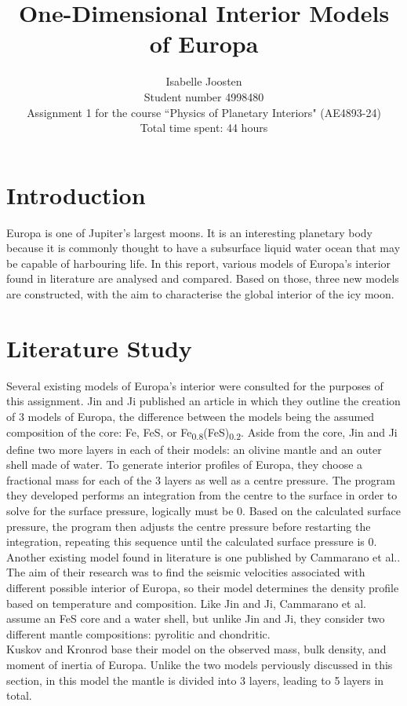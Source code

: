 \documentclass[twocolumn]{article}
\title{One-Dimensional Interior Models of Europa}
\author{Isabelle Joosten\\Student number 4998480\\Assignment 1 for the course ``Physics of Planetary Interiors" (AE4893-24)\\Total time spent: 44 hours}
\begin{document}
\maketitle

\section{Introduction}
Europa is one of Jupiter's largest moons. It is an interesting planetary body because it is commonly thought to have a subsurface liquid water ocean that may be capable of harbouring life. In this report, various models of Europa's interior found in literature are analysed and compared. Based on those, three new models are constructed, with the aim to characterise the global interior of the icy moon.

\section{Literature Study}
Several existing models of Europa's interior were consulted for the purposes of this assignment. Jin and Ji\cite{jinInternalStructureModels2012} published an article in which they outline the creation of 3 models of Europa, the difference between the models being the assumed composition of the core: Fe, FeS, or Fe\textsubscript{0.8}(FeS)\textsubscript{0.2}. Aside from the core, Jin and Ji define two more layers in each of their models: an olivine mantle and an outer shell made of water. To generate interior profiles of Europa, they choose a fractional mass for each of the 3 layers as well as a centre pressure. The program they developed performs an integration from the centre to the surface in order to solve for the surface pressure, logically must be 0. Based on the calculated surface pressure, the program then adjusts the centre pressure before restarting the integration, repeating this sequence until the calculated surface pressure is 0.\\
Another existing model found in literature is one published by Cammarano et al.\cite{cammaranoLongperiodSeismologyEuropa2006}. The aim of their research was to find the seismic velocities associated with different possible interior of Europa, so their model determines the density profile based on temperature and composition. Like Jin and Ji, Cammarano et al. assume an FeS core and a water shell, but unlike Jin and Ji, they consider two different mantle compositions: pyrolitic and chondritic.\\
Kuskov and Kronrod\cite{kuskovInternalStructureEuropa2005} base their model on the observed mass, bulk density, and moment of inertia of Europa. Unlike the two models perviously discussed in this section, in this model the mantle is divided into 3 layers, leading to 5 layers in total.\\
\end{document}
